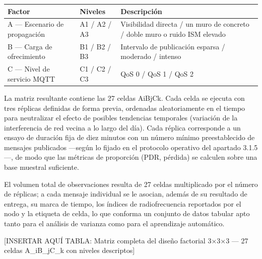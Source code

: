 \documentclass[
  12pt,
]{article}
\newcounter{none} %
\begin{document}
{\def\LTcaptype{none} %
\begin{longtable}[]{@{}
  >{\raggedright\arraybackslash}p{}
  >{\raggedright\arraybackslash}p{}
  >{\raggedright\arraybackslash}p{}@{}}
\toprule\noalign{}
\begin{minipage}[b]{\linewidth}\raggedright
Factor
\end{minipage} & \begin{minipage}[b]{\linewidth}\raggedright
Niveles
\end{minipage} & \begin{minipage}[b]{\linewidth}\raggedright
Descripción
\end{minipage} \\
\midrule\noalign{}
\endhead
\bottomrule\noalign{}
\endlastfoot
A — Escenario de propagación & A1 / A2 / A3 & Visibilidad directa / un
muro de concreto / doble muro o ruido ISM elevado \\
B — Carga de ofrecimiento & B1 / B2 / B3 & Intervalo de publicación
esparsa / moderado / intenso \\
C — Nivel de servicio MQTT & C1 / C2 / C3 & QoS 0 / QoS 1 / QoS 2 \\
\end{longtable}
}

La matriz resultante contiene las 27 celdas AiBjCk. Cada celda se
ejecuta con tres réplicas definidas de forma previa, ordenadas
aleatoriamente en el tiempo para neutralizar el efecto de posibles
tendencias temporales (variación de la interferencia de red vecina a lo
largo del día). Cada réplica corresponde a un ensayo de duración fija de
diez minutos con un número mínimo preestablecido de mensajes publicados
—según lo fijado en el protocolo operativo del apartado 3.1.5—, de modo
que las métricas de proporción (PDR, pérdida) se calculen sobre una base
muestral suficiente.

El volumen total de observaciones resulta de 27 celdas multiplicado por
el número de réplicas; a cada mensaje individual se le asocian, además
de su resultado de entrega, su marca de tiempo, los índices de
radiofrecuencia reportados por el nodo y la etiqueta de celda, lo que
conforma un conjunto de datos tabular apto tanto para el análisis de
varianza como para el aprendizaje automático.

{[}INSERTAR AQUÍ TABLA: Matriz completa del diseño factorial 3×3×3 — 27
celdas A\_iB\_jC\_k con niveles descriptos{]}
\end{document}
